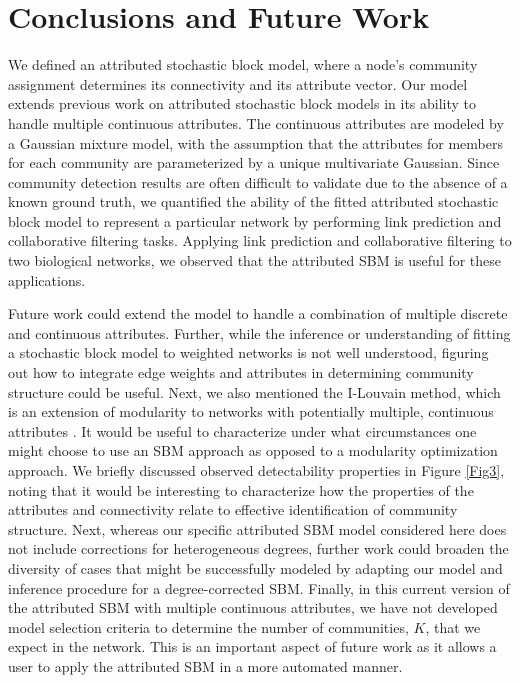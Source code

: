 \section{Conclusions and Future Work}
We defined an attributed stochastic block model, where a node's community assignment determines its connectivity and its attribute vector. Our model extends previous work on attributed stochastic block models in its ability to handle multiple continuous attributes. The continuous attributes are modeled by a Gaussian mixture model, with the assumption that the attributes for members for each community are parameterized by a unique multivariate Gaussian. Since community detection results are often difficult to validate due to the absence of a known ground truth, we quantified the ability of the fitted attributed stochastic block model to represent a particular network by performing link prediction and collaborative filtering tasks. Applying link prediction and collaborative filtering to two biological networks, we observed that the attributed SBM is useful for these applications.

Future work could extend the model to handle a combination of multiple discrete and continuous attributes. Further, while the inference or understanding of fitting a stochastic block model to weighted networks is not well understood, figuring out how to integrate edge weights and attributes in determining community structure could be useful. Next, we also mentioned the I-Louvain method, which is an extension of modularity to networks with potentially multiple, continuous attributes \cite{ilouvain}. It would be useful to characterize under what circumstances one might choose to use an SBM approach as opposed to a modularity optimization approach. We briefly discussed observed detectability properties in Figure \ref{Fig3}, noting that it would be interesting to characterize how the properties of the attributes and connectivity relate to effective identification of community structure. Next, whereas our specific attributed SBM model considered here does not include corrections for heterogeneous degrees, further work could broaden the diversity of cases that might be successfully modeled by adapting our model and inference procedure for a degree-corrected SBM. Finally, in this current version of the attributed SBM with multiple continuous attributes, we have not developed model selection criteria to determine the number of communities, $K$, that we expect in the network. This is an important aspect of future work as it allows a user to apply the attributed SBM in a more automated manner. 

